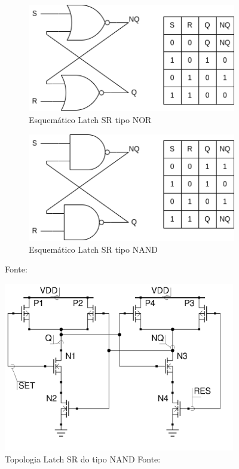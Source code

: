 \begin{figure}[htb]
     \centering
     \begin{subfigure}[b]{0.49\textwidth}
         \centering
         \includegraphics[width=\textwidth]{figuras/lacthSR_NOR.png}
         \caption{Esquemático Latch SR tipo NOR}
         \label{fig13}
     \end{subfigure}
     \hfill
     \begin{subfigure}[b]{0.49\textwidth}
         \centering
         \includegraphics[width=\textwidth]{figuras/lachSR_NAND.png}
         \caption{Esquemático Latch SR tipo NAND}
         \label{fig14}
     \end{subfigure}
        \caption{Fonte:\cite{cmos_digital}}
        \label{fig:latch}
\end{figure}


\begin{figure}[htb]
	\centering
	\includegraphics[width=0.9\textwidth]{figuras/lach_sr_NAND.png}
	\caption{Topologia Latch SR do tipo NAND Fonte:\cite{cmos_digital} }
	\label{fig15}
\end{figure}

